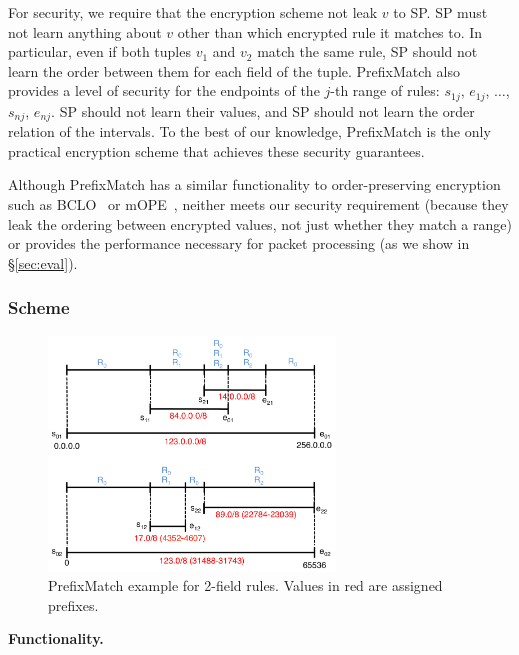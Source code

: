 For security, we require that the encryption scheme not leak $v$ to SP.
SP must not learn anything about $v$ other than which encrypted rule it matches to. 
In particular, even if both tuples $v_1$ and $v_2$ match the same rule, SP should not learn the order between them for each field of the tuple.
PrefixMatch also provides a level of security for the endpoints of the $j$-th range of rules:
 $s_{1j}$, $e_{1j}$, $\dots$, $s_{nj}$, $e_{nj}$. SP should not learn their values, and SP should not learn the order relation of the intervals. To the best of our knowledge, PrefixMatch is the only practical encryption scheme that achieves these security guarantees.

Although PrefixMatch has a similar functionality to order-preserving encryption such as BCLO~\cite{boldyreva:ope} or mOPE~\cite{popa:mope}, neither meets our security requirement (because they leak the ordering between encrypted values, not just whether they match a range) or provides the performance necessary for packet processing (as we show in \S\ref{sec:eval}).

\subsubsection{Scheme} 
\label{sec:rmscheme}

\begin{figure}[t]
  \centering
  \includegraphics[width=3in]{fig/rangeopts3.pdf}
  \caption[]{PrefixMatch example for 2-field rules. Values in red are assigned prefixes. \label{fig:rangeopts3}}
\end{figure}

\textbf{Functionality.}

